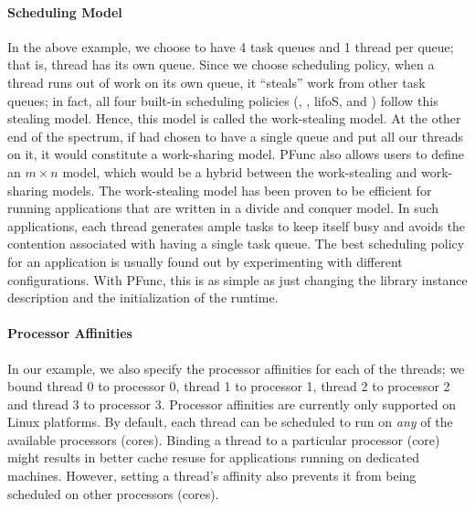 \paragraph{Scheduling Model} In the above example, we choose to have 4 task
queues and 1 thread per queue; that is, thread has its own queue. 
%
Since we choose  scheduling policy, when a thread runs out of work
on its own queue, it ``steals'' work from other task queues; in fact, all four
built-in scheduling policies (, , {lifoS}, and
) follow this stealing model.
%
Hence, this model is called the work-stealing model. 
%
At the other end of the spectrum, if had chosen to have a single queue and put
all our threads on it, it would constitute a work-sharing model. 
%
PFunc also allows users to define an $m\times{}n$ model, which would be a
hybrid between the work-stealing and work-sharing models.  
%
The work-stealing model has been proven to be efficient for running
applications that are written in a divide and conquer model. 
%
In such applications, each thread generates ample tasks to keep itself busy and
avoids the contention associated with having a single task queue. 
%
The best scheduling policy for an application is usually found out by
experimenting with different configurations. 
%
With PFunc, this is as simple as just changing the library instance description
and the initialization of the runtime.

\paragraph{Processor Affinities} 
%
In our example, we also specify the processor affinities for each of the
threads; we bound thread 0 to processor 0, thread 1 to processor 1, thread 2 to
processor 2 and thread 3 to processor 3.
%
Processor affinities are currently only supported on Linux platforms. 
%
By default, each thread can be scheduled to run on \textit{any} of the
available processors (cores). 
%
Binding a thread to a particular processor (core) might results in better cache
resuse for applications running on dedicated machines. 
%
However, setting a thread's affinity also prevents it from being scheduled on
other processors (cores). 

